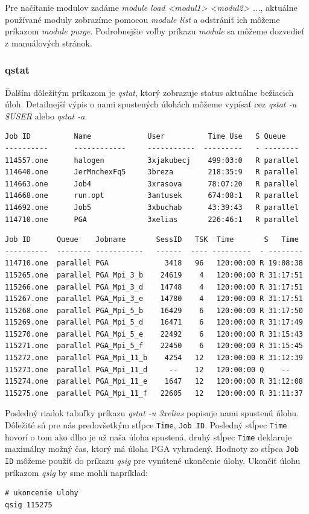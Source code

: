 Pre načítanie modulov zadáme \textit{module load <modul1> <modul2> ...}, aktuálne používané moduly zobrazíme pomocou
\textit{module list} a odstrániť ich môžeme príkazom \textit{module purge}.
Podrobnejšie voľby príkazu \textit{module} sa môžeme dozvedieť z manuálových stránok.

\subsubsection{qstat}
Ďalším dôležitým príkazom je \textit{qstat}, ktorý zobrazuje status aktuálne bežiacich úloh.
Detailnejší výpis o nami spustených úlohách môžeme vypísať cez \textit{qstat -u \$USER} alebo \textit{qstat -a}.
\begin{lstlisting}[caption={qstat}]
Job ID          Name             User          Time Use   S Queue
----------      ------------     -----------  ---------   - --------
114557.one      halogen          3xjakubecj    499:03:0   R parallel
114640.one      JerMnchexFq5     3breza        218:35:9   R parallel
114663.one      Job4             3xrasova      78:07:20   R parallel
114668.one      run.opt          3antusek      674:08:1   R parallel
114692.one      Job5             3xbuchab      43:39:43   R parallel
114710.one      PGA              3xelias       226:46:1   R parallel
\end{lstlisting}

\begin{lstlisting}[caption={qstat -u 3xelias}]
Job ID      Queue    Jobname       SessID   TSK  Time       S   Time
----------  -------- -----------   ------  ---- ---------  - --------
114710.one  parallel PGA             3418   96   120:00:00 R 19:08:38
115265.one  parallel PGA_Mpi_3_b    24619    4   120:00:00 R 31:17:51
115266.one  parallel PGA_Mpi_3_d    14748    4   120:00:00 R 31:17:51
115267.one  parallel PGA_Mpi_3_e    14780    4   120:00:00 R 31:17:51
115268.one  parallel PGA_Mpi_5_b    16429    6   120:00:00 R 31:17:50
115269.one  parallel PGA_Mpi_5_d    16471    6   120:00:00 R 31:17:49
115270.one  parallel PGA_Mpi_5_e    22492    6   120:00:00 R 31:15:43
115271.one  parallel PGA_Mpi_5_f    22450    6   120:00:00 R 31:15:45
115272.one  parallel PGA_Mpi_11_b    4254   12   120:00:00 R 31:12:39
115273.one  parallel PGA_Mpi_11_d     --    12   120:00:00 Q    -- 
115274.one  parallel PGA_Mpi_11_e    1647   12   120:00:00 R 31:12:08
115275.one  parallel PGA_Mpi_11_f   22605   12   120:00:00 R 31:11:37
\end{lstlisting}
Posledný riadok tabuľky príkazu \textit{qstat -u 3xelias} popisuje nami spustenú úlohu.
Dôležité sú pre nás predovšetkým stĺpce \texttt{Time}, \texttt{Job ID}.
Posledný stĺpec \texttt{Time} hovorí o tom ako dlho je už naša úloha spustená, druhý stĺpec \texttt{Time} deklaruje maximálny možný čas,
ktorý má úloha PGA vyhradený. Hodnoty zo stĺpca \texttt{Job ID} môžeme použiť do príkazu \textit{qsig} pre vynútené ukončenie úlohy.
Ukončiť úlohu príkazom \textit{qsig} by sme mohli napríklad:
\begin{lstlisting}
# ukoncenie ulohy
qsig 115275
\end{lstlisting}
